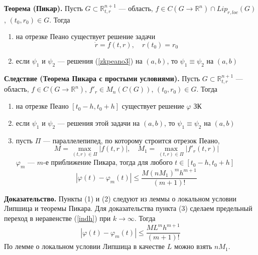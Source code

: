 \textbf{Теорема (Пикар).} Пусть $G \subset \mathbb{R}_{t,r}^{n+1}$ --- область, $f \in C(G \to \mathbb{R}^n) \cap Lip_{r,loc}(G)$, $(t_0, r_0) \in G$. Тогда
\begin{enumerate}
    \item на отрезке Пеано существует решение задачи
    \begin{equation}
        \dot{r} = f(t,r), \quad r(t_0) = r_0 \label{zkpeano3}
    \end{equation}
    \item если $\psi_1$ и $\psi_2$ --- решения (\ref{zkpeano3}) на $(a,b)$, то $\psi_1 \equiv \psi_2$ на $(a,b)$
\end{enumerate}

\noindent \textbf{Следствие (Теорема Пикара с простыми условиями).} Пусть $G \subset \mathbb{R}_{t,r}^{n+1}$ --- область, $f \in C(G \to \mathbb{R}^n)$, $f'_r \in M_n(C(G))$, $(t_0, r_0) \in G$. Тогда
\begin{enumerate}
    \item на отрезке Пеано $[t_0 - h, t_0 + h]$ существует решение $\varphi$ ЗК
    \item если $\psi_1$ и $\psi_2$ --- решения этой задачи на $(a,b)$, то $\psi_1 \equiv \psi_2$ на $(a,b)$
    \item пусть $\Pi$ --- параллелепипед, по которому строится отрезок Пеано,
    \begin{equation*}
        M = \max_{(t,r) \in \Pi} |f(t,r)|, \quad M_1 = \max_{(t,r) \in \Pi} |f'_r(t,r)|
    \end{equation*}
    $\varphi_m$ --- $m$-е приближение Пикара, тогда для любого $t \in [t_0 - h, t_0 + h]$
    \begin{equation*}
        |\varphi(t) - \varphi_m(t)| \le \frac{M(nM_1)^mh^{m+1}}{(m+1)!}
    \end{equation*}
\end{enumerate}
\textbf{Доказательство.} Пункты (1) и (2) следуют из леммы о локальном условии Липшица и теоремы Пикара. Для доказательства пункта (3) сделаем предельный переход в неравенстве (\ref{indh}) при $k \to \infty$. Тогда
\begin{equation*}
    |\varphi(t) - \varphi_m(t)| \le \frac{ML^mh^{m+1}}{(m+1)!}
\end{equation*}
По лемме о локальном условии Липшица в качестве $L$ можно взять $nM_1$.


